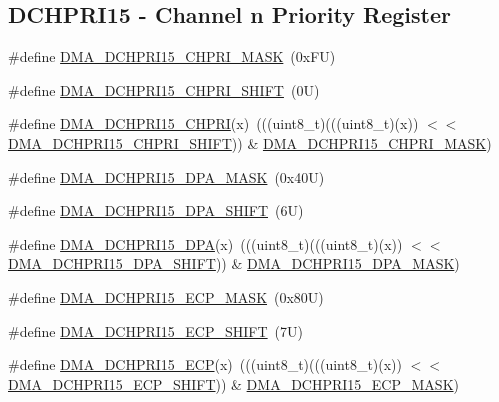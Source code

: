 \subsection*{D\+C\+H\+P\+R\+I15 -\/ Channel n Priority Register}
\begin{DoxyCompactItemize}
\item 
\#define \mbox{\hyperlink{group___d_m_a___register___masks_ga9dff6549497c3518454e82bb9f5c88a9}{D\+M\+A\+\_\+\+D\+C\+H\+P\+R\+I15\+\_\+\+C\+H\+P\+R\+I\+\_\+\+M\+A\+SK}}~(0x\+F\+U)
\item 
\#define \mbox{\hyperlink{group___d_m_a___register___masks_ga5e81f55c9806dcfa91352c763197b4cd}{D\+M\+A\+\_\+\+D\+C\+H\+P\+R\+I15\+\_\+\+C\+H\+P\+R\+I\+\_\+\+S\+H\+I\+FT}}~(0\+U)
\item 
\#define \mbox{\hyperlink{group___d_m_a___register___masks_ga6deef7b34df8edee0b7ad30775cefbbe}{D\+M\+A\+\_\+\+D\+C\+H\+P\+R\+I15\+\_\+\+C\+H\+P\+RI}}(x)~(((uint8\+\_\+t)(((uint8\+\_\+t)(x)) $<$$<$ \mbox{\hyperlink{group___d_m_a___register___masks_ga5e81f55c9806dcfa91352c763197b4cd}{D\+M\+A\+\_\+\+D\+C\+H\+P\+R\+I15\+\_\+\+C\+H\+P\+R\+I\+\_\+\+S\+H\+I\+FT}})) \& \mbox{\hyperlink{group___d_m_a___register___masks_ga9dff6549497c3518454e82bb9f5c88a9}{D\+M\+A\+\_\+\+D\+C\+H\+P\+R\+I15\+\_\+\+C\+H\+P\+R\+I\+\_\+\+M\+A\+SK}})
\item 
\#define \mbox{\hyperlink{group___d_m_a___register___masks_ga3b39c6e0610362d59e6ff055e29f0192}{D\+M\+A\+\_\+\+D\+C\+H\+P\+R\+I15\+\_\+\+D\+P\+A\+\_\+\+M\+A\+SK}}~(0x40\+U)
\item 
\#define \mbox{\hyperlink{group___d_m_a___register___masks_gad352f5ccc0fe19ea638ea2430ccc3afb}{D\+M\+A\+\_\+\+D\+C\+H\+P\+R\+I15\+\_\+\+D\+P\+A\+\_\+\+S\+H\+I\+FT}}~(6\+U)
\item 
\#define \mbox{\hyperlink{group___d_m_a___register___masks_ga3f2f4873fdaba82199ec5b665629fbf6}{D\+M\+A\+\_\+\+D\+C\+H\+P\+R\+I15\+\_\+\+D\+PA}}(x)~(((uint8\+\_\+t)(((uint8\+\_\+t)(x)) $<$$<$ \mbox{\hyperlink{group___d_m_a___register___masks_gad352f5ccc0fe19ea638ea2430ccc3afb}{D\+M\+A\+\_\+\+D\+C\+H\+P\+R\+I15\+\_\+\+D\+P\+A\+\_\+\+S\+H\+I\+FT}})) \& \mbox{\hyperlink{group___d_m_a___register___masks_ga3b39c6e0610362d59e6ff055e29f0192}{D\+M\+A\+\_\+\+D\+C\+H\+P\+R\+I15\+\_\+\+D\+P\+A\+\_\+\+M\+A\+SK}})
\item 
\#define \mbox{\hyperlink{group___d_m_a___register___masks_ga61fa9d2c60ec0993ecf63e1a3ed62e79}{D\+M\+A\+\_\+\+D\+C\+H\+P\+R\+I15\+\_\+\+E\+C\+P\+\_\+\+M\+A\+SK}}~(0x80\+U)
\item 
\#define \mbox{\hyperlink{group___d_m_a___register___masks_ga54aaf25e501504bf8a36a571670118c2}{D\+M\+A\+\_\+\+D\+C\+H\+P\+R\+I15\+\_\+\+E\+C\+P\+\_\+\+S\+H\+I\+FT}}~(7\+U)
\item 
\#define \mbox{\hyperlink{group___d_m_a___register___masks_ga8d8816ad290858fed972884f771dc4ce}{D\+M\+A\+\_\+\+D\+C\+H\+P\+R\+I15\+\_\+\+E\+CP}}(x)~(((uint8\+\_\+t)(((uint8\+\_\+t)(x)) $<$$<$ \mbox{\hyperlink{group___d_m_a___register___masks_ga54aaf25e501504bf8a36a571670118c2}{D\+M\+A\+\_\+\+D\+C\+H\+P\+R\+I15\+\_\+\+E\+C\+P\+\_\+\+S\+H\+I\+FT}})) \& \mbox{\hyperlink{group___d_m_a___register___masks_ga61fa9d2c60ec0993ecf63e1a3ed62e79}{D\+M\+A\+\_\+\+D\+C\+H\+P\+R\+I15\+\_\+\+E\+C\+P\+\_\+\+M\+A\+SK}})
\end{DoxyCompactItemize}
